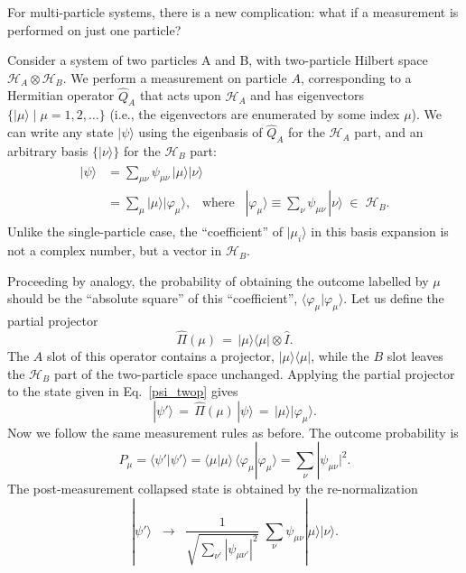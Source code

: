 \documentclass[pra,12pt]{revtex4}
\begin{document}
For multi-particle systems, there is a new complication: what if a
measurement is performed on just one particle?

Consider a system of two particles A and B, with two-particle Hilbert
space $\mathscr{H}_A \otimes \mathscr{H}_B$.  We perform a measurement
on particle $A$, corresponding to a Hermitian operator $\hat{Q}_A$
that acts upon $\mathscr{H}_A$ and has eigenvectors $\{|\mu\rangle\;
|\; \mu = 1, 2, \dots\}$ (i.e., the eigenvectors are enumerated by
some index $\mu$).  We can write any state $|\psi\rangle$ using the
eigenbasis of $\hat{Q}_A$ for the $\mathscr{H}_A$ part, and an
arbitrary basis $\{|\nu\rangle\}$ for the $\mathscr{H}_B$ part:
\begin{align}
  \begin{aligned}
    |\psi\rangle &= \sum_{\mu\nu}
    \psi_{\mu\nu}\, |\mu\rangle |\nu\rangle \\
    &= \sum_\mu |\mu\rangle |\varphi_\mu \rangle,
    \;\;\;\mathrm{where}\;\;\;
    |\varphi_\mu\rangle\equiv \sum_\nu \psi_{\mu\nu}\,|\nu\rangle
    \;\in\; \mathscr{H}_B.
  \end{aligned}
  \label{psi_twop}
\end{align}
Unlike the single-particle case, the ``coefficient'' of
$|\mu_i\rangle$ in this basis expansion is not a complex number, but a
vector in $\mathscr{H}_B$.

Proceeding by analogy, the probability of obtaining the outcome
labelled by $\mu$ should be the ``absolute square'' of this
``coefficient'', $\langle\varphi_\mu|\varphi_\mu\rangle$.  Let us
define the partial projector
\begin{equation}
  \hat{\Pi}(\mu) \,=\, |\mu\rangle\langle \mu| \otimes  \hat{I}.
\end{equation}
The $A$ slot of this operator contains a projector,
$|\mu\rangle\langle \mu|$, while the $B$ slot leaves the
$\mathscr{H}_B$ part of the two-particle space unchanged.  Applying
the partial projector to the state given in Eq.~\eqref{psi_twop} gives
\begin{equation}
  |\psi'\rangle \,=\, \hat{\Pi}(\mu)\, |\psi\rangle
  \,=\, |\mu\rangle |\varphi_\mu\rangle.
\end{equation}
Now we follow the same measurement rules as before.  The outcome
probability is
\begin{equation}
  P_\mu = \langle\psi'|\psi'\rangle
  = \langle \mu|\mu\rangle\, \langle \varphi_\mu|\varphi_\mu\rangle
  = \sum_\nu |\psi_{\mu\nu}|^2.
\end{equation}
The post-measurement collapsed state is obtained by the
re-normalization
\begin{equation}
  |\psi'\rangle
  \;\;\rightarrow\;\;
  \frac{1}{\sqrt{\sum_{\nu'} |\psi_{\mu\nu'}|^2}}\;
  \sum_{\nu} \psi_{\mu\nu} |\mu\rangle |\nu\rangle.
\end{equation}
\end{document}
